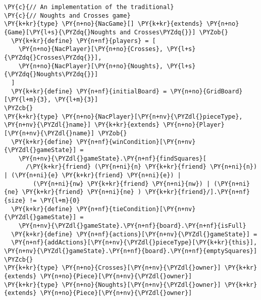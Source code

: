 \begin{Verbatim}[commandchars=\\\{\}]
\PY{c}{// An implementation of the traditional}
\PY{c}{// Noughts and Crosses game}
\PY{k+kr}{type} \PY{n+no}{NacGame}[] \PY{k+kr}{extends} \PY{n+no}{Game}[\PY{l+s}{\PYZdq{}Noughts and Crosses\PYZdq{}}] \PYZob{}
  \PY{k+kr}{define} \PY{n+nf}{players} = [
    \PY{n+no}{NacPlayer}[\PY{n+no}{Crosses}, \PY{l+s}{\PYZdq{}Crosses\PYZdq{}}],
    \PY{n+no}{NacPlayer}[\PY{n+no}{Noughts}, \PY{l+s}{\PYZdq{}Noughts\PYZdq{}}]
  ]
  \PY{k+kr}{define} \PY{n+nf}{initialBoard} = \PY{n+no}{GridBoard}[\PY{l+m}{3}, \PY{l+m}{3}]
\PYZcb{}
\PY{k+kr}{type} \PY{n+no}{NacPlayer}[\PY{n+nv}{\PYZdl{}pieceType}, \PY{n+nv}{\PYZdl{}name}] \PY{k+kr}{extends} \PY{n+no}{Player}[\PY{n+nv}{\PYZdl{}name}] \PYZob{}
  \PY{k+kr}{define} \PY{n+nf}{winCondition}[\PY{n+nv}{\PYZdl{}gameState}] =
    \PY{n+nv}{\PYZdl{}gameState}.\PY{n+nf}{findSquares}[
      /\PY{k+kr}{friend} (\PY{n+ni}{n} \PY{k+kr}{friend} \PY{n+ni}{n}) | (\PY{n+ni}{e} \PY{k+kr}{friend} \PY{n+ni}{e}) |
        (\PY{n+ni}{nw} \PY{k+kr}{friend} \PY{n+ni}{nw}) | (\PY{n+ni}{ne} \PY{k+kr}{friend} \PY{n+ni}{ne} ) \PY{k+kr}{friend}/].\PY{n+nf}{size} != \PY{l+m}{0}
  \PY{k+kr}{define} \PY{n+nf}{tieCondition}[\PY{n+nv}{\PYZdl{}gameState}] =
    \PY{n+nv}{\PYZdl{}gameState}.\PY{n+nf}{board}.\PY{n+nf}{isFull}
  \PY{k+kr}{define} \PY{n+nf}{actions}[\PY{n+nv}{\PYZdl{}gameState}] =
  \PY{n+nf}{addActions}[\PY{n+nv}{\PYZdl{}pieceType}[\PY{k+kr}{this}], \PY{n+nv}{\PYZdl{}gameState}.\PY{n+nf}{board}.\PY{n+nf}{emptySquares}]
\PYZcb{}
\PY{k+kr}{type} \PY{n+no}{Crosses}[\PY{n+nv}{\PYZdl{}owner}] \PY{k+kr}{extends} \PY{n+no}{Piece}[\PY{n+nv}{\PYZdl{}owner}]
\PY{k+kr}{type} \PY{n+no}{Noughts}[\PY{n+nv}{\PYZdl{}owner}] \PY{k+kr}{extends} \PY{n+no}{Piece}[\PY{n+nv}{\PYZdl{}owner}]
\end{Verbatim}
